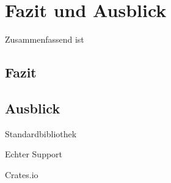 \chapter{Fazit und Ausblick}\label{sec:conclusion}


Zusammenfassend ist 

\section{Fazit}

\section{Ausblick}

Standardbibliothek

Echter Support

Crates.io